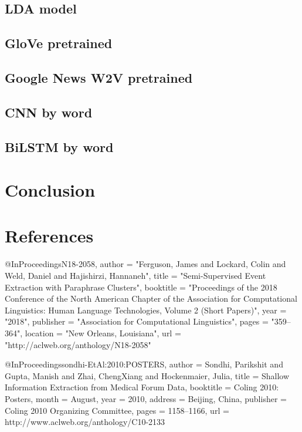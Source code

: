 \documentclass[11pt]{article}
\begin{document}
\subsection{LDA model}


\subsection{GloVe pretrained}

\subsection{Google News W2V pretrained}

\subsection{CNN by word}

\subsection{BiLSTM by word}


\section{Conclusion}

\section{References}

@InProceedings{N18-2058,
  author = 	"Ferguson, James
		and Lockard, Colin
		and Weld, Daniel
		and Hajishirzi, Hannaneh",
  title = 	"Semi-Supervised Event Extraction with Paraphrase Clusters",
  booktitle = 	"Proceedings of the 2018 Conference of the North American Chapter of the Association for Computational Linguistics: Human Language Technologies, Volume 2 (Short Papers)",
  year = 	"2018",
  publisher = 	"Association for Computational Linguistics",
  pages = 	"359--364",
  location = 	"New Orleans, Louisiana",
  url = 	"http://aclweb.org/anthology/N18-2058"
}

@InProceedings{sondhi-EtAl:2010:POSTERS,
  author    = {Sondhi, Parikshit  and  Gupta, Manish  and  Zhai, ChengXiang  and  Hockenmaier, Julia},
  title     = {Shallow Information Extraction from Medical Forum Data},
  booktitle = {Coling 2010: Posters},
  month     = {August},
  year      = {2010},
  address   = {Beijing, China},
  publisher = {Coling 2010 Organizing Committee},
  pages     = {1158--1166},
  url       = {http://www.aclweb.org/anthology/C10-2133}
}
\end{document}
